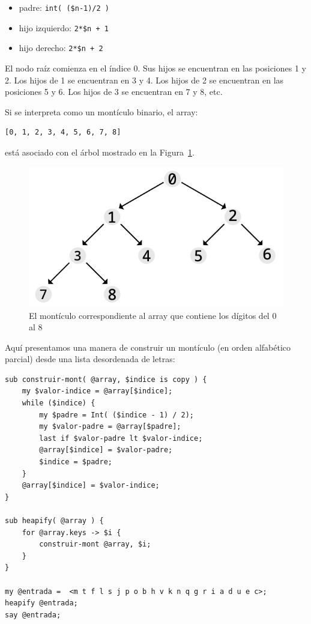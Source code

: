 \begin{itemize}
\item padre: \verb|int( ($n-1)/2 )|
\item hijo izquierdo: \verb|2*$n + 1|
\item hijo derecho: \verb|2*$n + 2|
\end{itemize}

El nodo raíz comienza en el índice 0. Sus hijos se encuentran
en las posiciones 1 y 2. Los hijos de 1 se encuentran en 3 y 4.
Los hijos de 2 se encuentran en las posiciones 5 y 6. Los
hijos de 3 se encuentran en 7 y 8, etc.

Si se interpreta como un montículo binario, el array:
\begin{verbatim}
[0, 1, 2, 3, 4, 5, 6, 7, 8]
\end{verbatim}

está asociado con el árbol mostrado en la Figura~\ref{fig.heap}.

\begin{figure}
\centerline
{\includegraphics[scale=1]{figs/figure_heap.pdf}}
\caption{El montículo correspondiente al array que contiene los
dígitos del 0 al 8}
\label{fig.heap}
\end{figure}

Aquí presentamos una manera de construir un montículo (en 
orden alfabético parcial) desde una lista desordenada 
de letras:

\begin{verbatim}
sub construir-mont( @array, $indice is copy ) {
    my $valor-indice = @array[$indice];
    while ($indice) {
        my $padre = Int( ($indice - 1) / 2);
        my $valor-padre = @array[$padre];
        last if $valor-padre lt $valor-indice;
        @array[$indice] = $valor-padre;
        $indice = $padre;
    }
    @array[$indice] = $valor-indice;
}

sub heapify( @array ) {
    for @array.keys -> $i {
    	construir-mont @array, $i;
    }
}

my @entrada =  <m t f l s j p o b h v k n q g r i a d u e c>; 
heapify @entrada;
say @entrada;
\end{verbatim}

